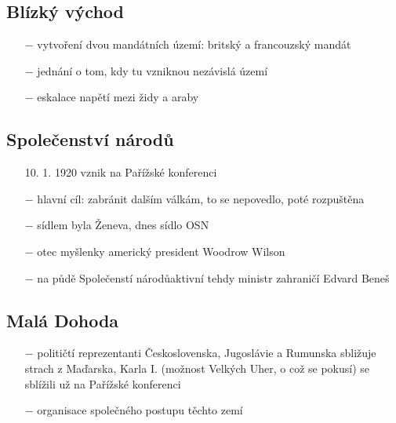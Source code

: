 \documentclass{article}
\begin{document}
\subsection*{Blízký východ}
\begin{itemize}
    \vspace{-0.5em}
    \setlength\itemsep{0.15em}
    \item[$-$] vytvoření dvou mandátních území: britský a francouzský mandát
    \item[$-$] jednání o tom, kdy tu vzniknou nezávislá území
    \item[$-$] eskalace napětí mezi židy a araby
\end{itemize}

\subsection*{Společenství národů}
\begin{itemize}
    \vspace{-0.5em}
    \setlength\itemsep{0.15em}
    \item[10. 1. 1920] vznik na Pařížské konferenci
    \item[$-$] hlavní cíl: zabránit dalším válkám, to se nepovedlo, poté rozpuštěna
    \item[$-$] sídlem byla Ženeva, dnes sídlo OSN
    \item[$-$] otec myšlenky americký president Woodrow Wilson
    \item[$-$] na půdě Společenstí národůaktivní tehdy ministr zahraničí Edvard Beneš
\end{itemize}

\subsection*{Malá Dohoda}
\begin{itemize}
    \vspace{-0.5em}
    \setlength\itemsep{0.15em}
    \item[$-$] političtí reprezentanti Československa, Jugoslávie a Rumunska sbližuje strach z Maďarska, Karla I. (možnost Velkých Uher, o což se pokusí) se sblížili už na Pařížské konferenci
    \item[$-$] organisace společného postupu těchto zemí
\end{itemize}
\end{document}
